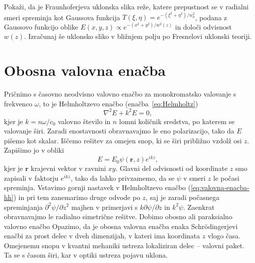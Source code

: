 \begin{definition}
Pokaži, da je Fraunhoferjeva uklonska slika reže, katere prepustnost se v radialni smeri
spreminja kot Gaussova funkcija $T(\xi, \eta)=e^{-(\xi^2+\eta^2)/w_0^2}$, podana z Gaussovo funkcijo
oblike $E(x,y,z) \propto e^{-(x^2+y^2)/w^2(z)}$ in dolo\v ci odvisnost $w(z)$. Izračunaj še 
uklonsko sliko v bližnjem polju po Fresnelovi uklonski teoriji.
\end{definition}

\section{Obosna valovna enačba}
Pričnimo s časovno neodvisno valovno enačbo za monokromatsko valovanje
s frekvenco $\omega$, to je Helmholtzevo enačbo (enačba~\ref{eq:Helmholtz})
\begin{equation}
\nabla^{2}E+k^{2}E=0,
\label{eq:valovna-enacba-hh}
\end{equation}
kjer je $k=n\omega/c_{0}$ valovno število in $n$ lomni količnik
sredstva, po katerem se valovanje širi. Zaradi enostavnosti obravnavajmo
le eno polarizacijo, tako da $E$ pišemo kot skalar. Iščemo rešitev za
omejen snop, ki se širi približno vzdolž osi $z$. Zapišimo jo v obliki
\begin{equation}
E=E_{0}\psi(\mathbf{r},z)e^{ikz},
\label{eq:ravni-val-nastavek}
\end{equation}
kjer je $\mathbf{r}$ krajevni vektor v ravnini $xy$. Glavni del odvisnosti
od koordinate $z$ smo zapisali v faktorju $e^{ikz}$, tako da lahko
privzamemo, da se $\psi$ v smeri $z$ le počasi spreminja. Vstavimo
gornji nastavek v Helmholtzevo enačbo (\ref{eq:valovna-enacba-hh})
in pri tem zanemarimo druge odvode po $z$, saj je zaradi počasnega spreminjanja
$\partial^{2}\psi/\partial z^{2}$ majhen v primerjavi s $k\partial\psi/\partial z$ in $k^{2}\psi$.
Zaenkrat obravnavajmo le radialno simetrične rešitve. Dobimo obosno
ali paraksialno valovno enačbo
Opazimo, da je obosna valovna enačba enaka Schr\"{o}dingerjevi enačbi
za prost delec v dveh dimenzijah, v kateri ima koordinata $z$ vlogo
časa. Omejenemu snopu v kvantni mehaniki ustreza lokaliziran delec
-- valovni paket. Ta se s časom širi, kar v optiki ustreza pojavu uklona.

